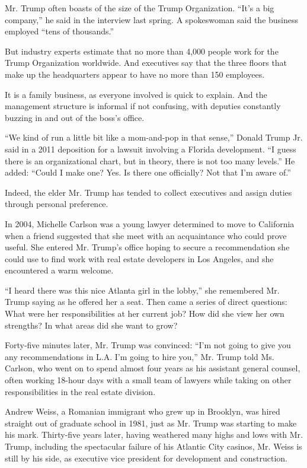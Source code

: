 Mr. Trump often boasts of the size of the Trump Organization. ``It's a
big company,'' he said in the interview last spring. A spokeswoman said
the business employed ``tens of thousands.''

But industry experts estimate that no more than 4,000 people work for
the Trump Organization worldwide. And executives say that the three
floors that make up the headquarters appear to have no more than 150
employees.

It is a family business, as everyone involved is quick to explain. And
the management structure is informal if not confusing, with deputies
constantly buzzing in and out of the boss's office.

``We kind of run a little bit like a mom-and-pop in that sense,'' Donald
Trump Jr. said in a 2011 deposition for a lawsuit involving a Florida
development. ``I guess there is an organizational chart, but in theory,
there is not too many levels.'' He added: ``Could I make one? Yes. Is
there one officially? Not that I'm aware of.''

Indeed, the elder Mr. Trump has tended to collect executives and assign
duties through personal preference.

In 2004, Michelle Carlson was a young lawyer determined to move to
California when a friend suggested that she meet with an acquaintance
who could prove useful. She entered Mr. Trump's office hoping to secure
a recommendation she could use to find work with real estate developers
in Los Angeles, and she encountered a warm welcome.

``I heard there was this nice Atlanta girl in the lobby,'' she
remembered Mr. Trump saying as he offered her a seat. Then came a series
of direct questions: What were her responsibilities at her current job?
How did she view her own strengths? In what areas did she want to grow?

Forty-five minutes later, Mr. Trump was convinced: ``I'm not going to
give you any recommendations in L.A. I'm going to hire you,'' Mr. Trump
told Ms. Carlson, who went on to spend almost four years as his
assistant general counsel, often working 18-hour days with a small team
of lawyers while taking on other responsibilities in the real estate
division.

Andrew Weiss, a Romanian immigrant who grew up in Brooklyn, was hired
straight out of graduate school in 1981, just as Mr. Trump was starting
to make his mark. Thirty-five years later, having weathered many highs
and lows with Mr. Trump, including the spectacular failure of his
Atlantic City casinos, Mr. Weiss is still by his side, as executive vice
president for development and construction.

